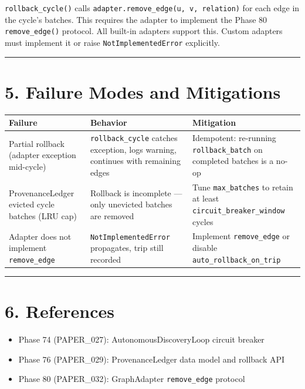 \texttt{rollback\_cycle()} calls \texttt{adapter.remove\_edge(u, v, relation)} for each edge in the cycle's batches. This requires the adapter to implement the Phase 80 \texttt{remove\_edge()} protocol. All built-in adapters support this. Custom adapters must implement it or raise \texttt{NotImplementedError} explicitly.

\medskip\noindent\rule{\linewidth}{0.4pt}\medskip

\section*{5. Failure Modes and Mitigations}

\begin{table}[h]
\small\centering
\begin{tabular}{lll}
\toprule
Failure & Behavior & Mitigation \\
\midrule
Partial rollback (adapter exception mid-cycle) & \texttt{rollback\_cycle} catches exception, logs warning, continues with remaining edges & Idempotent: re-running \texttt{rollback\_batch} on completed batches is a no-op \\
ProvenanceLedger evicted cycle batches (LRU cap) & Rollback is incomplete --- only unevicted batches are removed & Tune \texttt{max\_batches} to retain at least \texttt{circuit\_breaker\_window} cycles \\
Adapter does not implement \texttt{remove\_edge} & \texttt{NotImplementedError} propagates, trip still recorded & Implement \texttt{remove\_edge} or disable \texttt{auto\_rollback\_on\_trip} \\
\bottomrule
\end{tabular}
\end{table}


\medskip\noindent\rule{\linewidth}{0.4pt}\medskip

\section*{6. References}

\begin{itemize}
  \item Phase 74 (PAPER_027): AutonomousDiscoveryLoop circuit breaker
  \item Phase 76 (PAPER_029): ProvenanceLedger data model and rollback API
  \item Phase 80 (PAPER_032): GraphAdapter \texttt{remove\_edge} protocol
\end{itemize}

